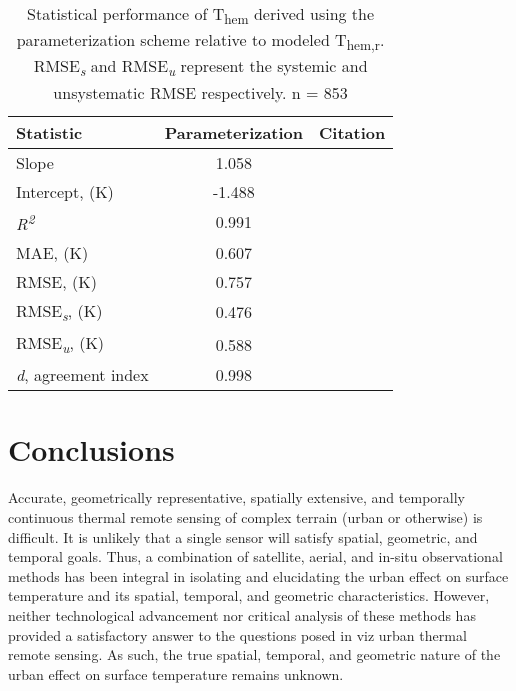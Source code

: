 \begin{bibunit}
\begin{table}[H]
 	\centering
 	\caption{Statistical performance of T\textsubscript{hem} derived using the parameterization scheme relative to modeled T\textsubscript{hem,r}. RMSE\textit{\textsubscript{s}} and RMSE\textit{\textsubscript{u}} represent the systemic and unsystematic RMSE respectively. n = 853}
 	\label{parastats}
 	\begin{tabular}{lcr}
 		\toprule 
 		Statistic & Parameterization & Citation \\  \midrule
 		Slope & 1.058 &  \\ 
 		Intercept, (\si{\kelvin}) & -1.488 &   \\ 
 		\textit{R\textsuperscript{2}} & 0.991 & \\ 
 		MAE,  (\si{\kelvin}) & 0.607& \citep{Willmott1985a} \\ 
 		RMSE,  (\si{\kelvin}) & 0.757 & \citep{Willmott1985a} \\ 
 		RMSE\textit{\textsubscript{s}},  (\si{\kelvin}) & 0.476  & \citep{Willmott1985a} \\ 
 		RMSE\textit{\textsubscript{u}},  (\si{\kelvin}) & 0.588  & \citep{Willmott1985a} \\ 
 		\textit{d}, agreement index & 0.998 & \citep{Willmott2012} \\
 		\bottomrule
 	\end{tabular} 
\end{table}
 
 \section{Conclusions}
 
Accurate, geometrically representative, spatially extensive, and temporally continuous thermal remote sensing of complex terrain (urban or otherwise) is difficult. It is unlikely that a single sensor will satisfy spatial, geometric, and temporal goals. Thus, a combination of satellite, aerial, and in-situ observational methods has been integral in isolating and elucidating the urban effect on surface temperature and its spatial, temporal, and geometric characteristics. However, neither technological advancement nor critical analysis of these methods has provided a satisfactory answer to the questions posed in \citet{Roth1989} viz urban thermal remote sensing. As such, the true spatial, temporal, and geometric nature of the urban effect on surface temperature remains unknown. 
 

\end{bibunit}
